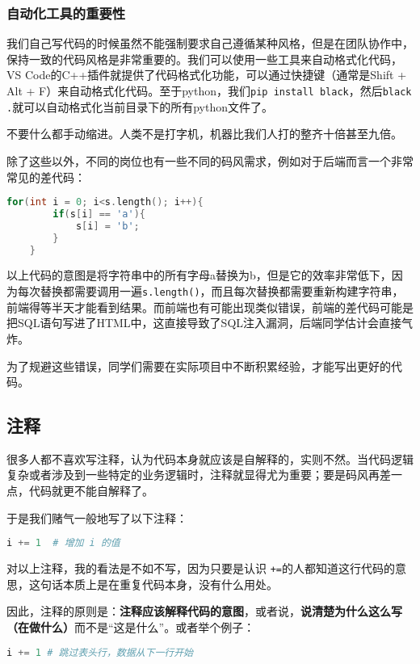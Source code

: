 \documentclass[../main.tex]{subfiles}
\begin{document}
\subsubsection{自动化工具的重要性}
我们自己写代码的时候虽然不能强制要求自己遵循某种风格，但是在团队协作中，保持一致的代码风格是非常重要的。我们可以使用一些工具来自动格式化代码，VS Code的C++插件就提供了代码格式化功能，可以通过快捷键（通常是Shift + Alt + F）来自动格式化代码。至于python，我们\texttt{pip install black}，然后\texttt{black .}就可以自动格式化当前目录下的所有python文件了。

不要什么都手动缩进。人类不是打字机，机器比我们人打的整齐十倍甚至九倍。

除了这些以外，不同的岗位也有一些不同的码风需求，例如对于后端而言一个非常常见的差代码：
\begin{lstlisting}[language=C++]
    for(int i = 0; i<s.length(); i++){
        if(s[i] == 'a'){
            s[i] = 'b';
        }
    }
\end{lstlisting}
以上代码的意图是将字符串中的所有字母a替换为b，但是它的效率非常低下，因为每次替换都需要调用一遍\texttt{s.length()}，而且每次替换都需要重新构建字符串，前端得等半天才能看到结果。而前端也有可能出现类似错误，前端的差代码可能是把SQL语句写进了HTML中，这直接导致了SQL注入漏洞，后端同学估计会直接气炸。

为了规避这些错误，同学们需要在实际项目中不断积累经验，才能写出更好的代码。

\subsection{注释}

很多人都不喜欢写注释，认为代码本身就应该是自解释的，实则不然。当代码逻辑复杂或者涉及到一些特定的业务逻辑时，注释就显得尤为重要；要是码风再差一点，代码就更不能自解释了。

于是我们赌气一般地写了以下注释：
\begin{lstlisting}[language=Python]
    i += 1  # 增加 i 的值
\end{lstlisting}

对以上注释，我的看法是不如不写，因为只要是认识 \texttt{+=}的人都知道这行代码的意思，这句话本质上是在重复代码本身，没有什么用处。

因此，注释的原则是：\textbf{注释应该解释代码的意图}，或者说，\textbf{说清楚为什么这么写（在做什么）}而不是“这是什么”。或者举个例子：

\begin{lstlisting}[language=Python]
    i += 1 # 跳过表头行，数据从下一行开始
\end{lstlisting}
\end{document}

